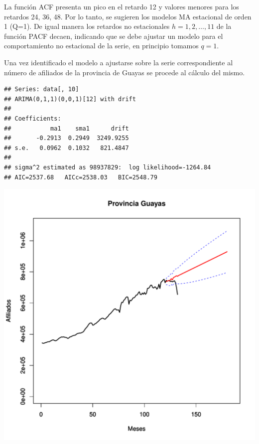 \documentclass[11pt,a4paper,oneside]{article}\usepackage[]{graphicx}\usepackage[]{color}
\makeatletter
\def\maxwidth{ %
  \ifdim\Gin@nat@width>\linewidth
    \linewidth
  \else
    \Gin@nat@width
  \fi
}
\newenvironment{kframe}{%
 \def\at@end@of@kframe{}%
 \ifinner\ifhmode%
  \def\at@end@of@kframe{\end{minipage}}%
  \begin{minipage}{\columnwidth}%
 \fi\fi%
 \def\FrameCommand##1{\hskip\@totalleftmargin \hskip-\fboxsep
 \colorbox{shadecolor}{##1}\hskip-\fboxsep
     \hskip-\linewidth \hskip-\@totalleftmargin \hskip\columnwidth}%
 \MakeFramed {\advance\hsize-\width
   \@totalleftmargin\z@ \linewidth\hsize
   \@setminipage}}%
 {\par\unskip\endMakeFramed%
 \at@end@of@kframe}
\newenvironment{knitrout}{}{} %
\makeatother
\begin{document}
La función ACF presenta un pico en el retardo 12 y valores menores para los retardos 24, 36, 48. Por lo tanto, se sugieren los modelos MA estacional de orden 1 (Q=1). De igual manera los retardos no estacionales $h=1,2,\ldots, 11$ de la función PACF decaen, indicando que se debe ajustar un modelo  para el comportamiento no estacional de la serie, en principio tomamos $q=1$.\newline

Una vez identificado el modelo a ajustarse sobre la serie correspondiente al número de afiliados de la provincia de Guayas se procede al cálculo del mismo.

\begin{knitrout}
\color{fgcolor}\begin{kframe}
\begin{verbatim}
## Series: data[, 10] 
## ARIMA(0,1,1)(0,0,1)[12] with drift         
## 
## Coefficients:
##           ma1    sma1      drift
##       -0.2913  0.2949  3249.9255
## s.e.   0.0962  0.1032   821.4847
## 
## sigma^2 estimated as 98937829:  log likelihood=-1264.84
## AIC=2537.68   AICc=2538.03   BIC=2548.79
\end{verbatim}
\end{kframe}
\end{knitrout}

\begin{knitrout}
\color{fgcolor}
\includegraphics[width=\maxwidth]{figure/unnamed-chunk-8-1} 

\end{knitrout}
\end{document}
